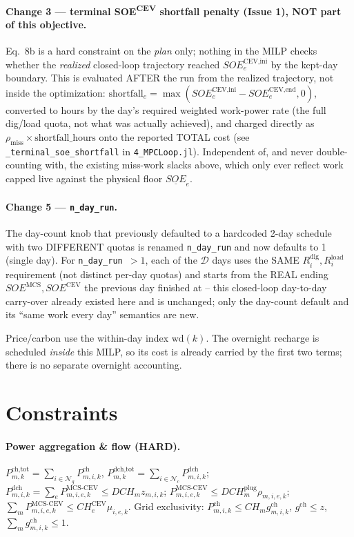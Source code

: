 \documentclass[11pt]{article}
\begin{document}
\paragraph{Change 3 --- terminal SOE\textsuperscript{CEV} shortfall penalty (Issue 1), NOT part of
this objective.} Eq.~8b is a hard constraint on the \emph{plan} only; nothing in the MILP checks
whether the \emph{realized} closed-loop trajectory reached $SOE^{\text{CEV,ini}}_e$ by the kept-day
boundary. This is evaluated AFTER the run from the realized trajectory, not inside the
optimization: $\text{shortfall}_e=\max(SOE^{\text{CEV,ini}}_e-SOE^{\text{CEV,end}}_e,0)$, converted
to hours by the day's required weighted work-power rate (the full dig/load quota, not what was
actually achieved), and charged directly as
$\rho_{\text{miss}}\times\text{shortfall\_hours}$ onto the reported TOTAL cost (see
\texttt{\_terminal\_soe\_shortfall} in \texttt{4\_MPCLoop.jl}). Independent of, and never
double-counting with, the existing miss-work slacks above, which only ever reflect work capped
live against the physical floor $\underline{SOE}_e$.

\paragraph{Change 5 --- \texttt{n\_day\_run}.} The day-count knob that previously defaulted to a
hardcoded 2-day schedule with two DIFFERENT quotas is renamed \texttt{n\_day\_run} and now defaults
to 1 (single day). For \texttt{n\_day\_run}~$>1$, each of the $\mathcal{D}$ days uses the SAME
$R^{\text{dig}}_i,R^{\text{load}}_i$ requirement (not distinct per-day quotas) and starts from the
REAL ending $SOE^{\text{MCS}},SOE^{\text{CEV}}$ the previous day finished at -- this closed-loop
day-to-day carry-over already existed here and is unchanged; only the day-count default and its
``same work every day'' semantics are new.

Price/carbon use the within-day index $\mathrm{wd}(k)$. The overnight recharge is scheduled
\emph{inside} this MILP, so its cost is already carried by the first two terms; there is no
separate overnight accounting.

\section{Constraints}

\paragraph{Power aggregation \& flow (HARD).}
$P^{\text{ch,tot}}_{m,k}=\sum_{i\in\mathcal{N}_g}P^{\text{ch}}_{m,i,k}$,
$P^{\text{dch,tot}}_{m,k}=\sum_{i\in\mathcal{N}_c}P^{\text{dch}}_{m,i,k}$;
$P^{\text{dch}}_{m,i,k}=\sum_e P^{\text{MCS-CEV}}_{m,i,e,k}\le DCH_m z_{m,i,k}$;
$P^{\text{MCS-CEV}}_{m,i,e,k}\le DCH^{\text{plug}}_m\rho_{m,i,e,k}$;
$\sum_m P^{\text{MCS-CEV}}_{m,i,e,k}\le CH^{\text{CEV}}_e\mu_{i,e,k}$.
Grid exclusivity: $P^{\text{ch}}_{m,i,k}\le CH_m g^{\text{ch}}_{m,i,k}$,
$g^{\text{ch}}\le z$, $\sum_m g^{\text{ch}}_{m,i,k}\le 1$.
\end{document}

